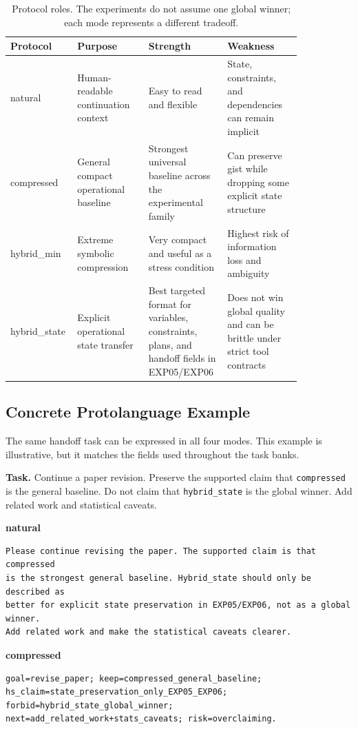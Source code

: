 \documentclass[11pt]{article}
\begin{document}
\begin{table}[ht]
\centering
\small
\begin{tabular}{p{0.13\linewidth}p{0.23\linewidth}p{0.24\linewidth}p{0.24\linewidth}}
\toprule
Protocol & Purpose & Strength & Weakness \\
\midrule
natural & Human-readable continuation context & Easy to read and flexible & State, constraints, and dependencies can remain implicit \\
compressed & General compact operational baseline & Strongest universal baseline across the experimental family & Can preserve gist while dropping some explicit state structure \\
hybrid\_min & Extreme symbolic compression & Very compact and useful as a stress condition & Highest risk of information loss and ambiguity \\
hybrid\_state & Explicit operational state transfer & Best targeted format for variables, constraints, plans, and handoff fields in EXP05/EXP06 & Does not win global quality and can be brittle under strict tool contracts \\
\bottomrule
\end{tabular}
\caption{Protocol roles. The experiments do not assume one global winner; each mode represents a different tradeoff.}
\label{tab:protocol_roles}
\end{table}

\subsection{Concrete Protolanguage Example}
The same handoff task can be expressed in all four modes. This example is illustrative, but it matches the fields used throughout the task banks.

\noindent\textbf{Task.} Continue a paper revision. Preserve the supported claim that \texttt{compressed} is the general baseline. Do not claim that \texttt{hybrid\_state} is the global winner. Add related work and statistical caveats.

\noindent\textbf{natural}
\begin{verbatim}
Please continue revising the paper. The supported claim is that compressed
is the strongest general baseline. Hybrid_state should only be described as
better for explicit state preservation in EXP05/EXP06, not as a global winner.
Add related work and make the statistical caveats clearer.
\end{verbatim}

\noindent\textbf{compressed}
\begin{verbatim}
goal=revise_paper; keep=compressed_general_baseline;
hs_claim=state_preservation_only_EXP05_EXP06; forbid=hybrid_state_global_winner;
next=add_related_work+stats_caveats; risk=overclaiming.
\end{verbatim}
\end{document}
